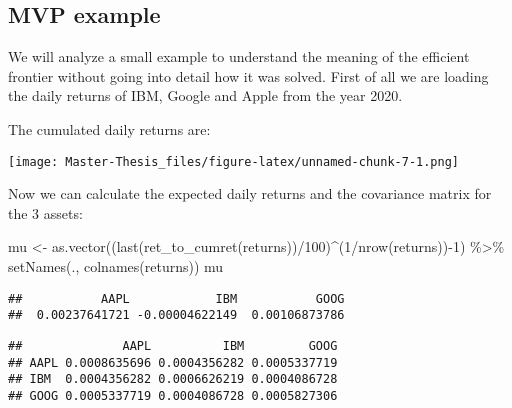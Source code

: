 \documentclass[
  oneside]{book}
\newenvironment{Shaded}{\begin{snugshade}}{\end{snugshade}}
\newcommand{\DecValTok}[1]{\textcolor[rgb]{0.00,0.00,0.81}{#1}}
\newcommand{\FunctionTok}[1]{\textcolor[rgb]{0.00,0.00,0.00}{#1}}
\newcommand{\NormalTok}[1]{#1}
\newcommand{\OtherTok}[1]{\textcolor[rgb]{0.56,0.35,0.01}{#1}}
\newcommand{\SpecialCharTok}[1]{\textcolor[rgb]{0.00,0.00,0.00}{#1}}
\begin{document}
\hypertarget{mvp-example}{%
\subsection{MVP example}\label{mvp-example}}

We will analyze a small example to understand the meaning of the efficient frontier without going into detail how it was solved. First of all we are loading the daily returns of IBM, Google and Apple from the year 2020.

The cumulated daily returns are:

\texttt{[image: Master-Thesis\_files/figure-latex/unnamed-chunk-7-1.png]}

Now we can calculate the expected daily returns and the covariance matrix for the 3 assets:

\begin{Shaded}
\begin{Highlighting}[]
\NormalTok{mu }\OtherTok{\textless{}{-}} \FunctionTok{as.vector}\NormalTok{((}\FunctionTok{last}\NormalTok{(}\FunctionTok{ret\_to\_cumret}\NormalTok{(returns))}\SpecialCharTok{/}\DecValTok{100}\NormalTok{)}\SpecialCharTok{\^{}}\NormalTok{(}\DecValTok{1}\SpecialCharTok{/}\FunctionTok{nrow}\NormalTok{(returns))}\SpecialCharTok{{-}}\DecValTok{1}\NormalTok{) }\SpecialCharTok{\%\textgreater{}\%} 
  \FunctionTok{setNames}\NormalTok{(., }\FunctionTok{colnames}\NormalTok{(returns))}
\NormalTok{mu}
\end{Highlighting}
\end{Shaded}

\begin{verbatim}
##           AAPL            IBM           GOOG 
##  0.00237641721 -0.00004622149  0.00106873786
\end{verbatim}

\begin{Shaded}
\end{Shaded}

\begin{verbatim}
##              AAPL          IBM         GOOG
## AAPL 0.0008635696 0.0004356282 0.0005337719
## IBM  0.0004356282 0.0006626219 0.0004086728
## GOOG 0.0005337719 0.0004086728 0.0005827306
\end{verbatim}
\end{document}
